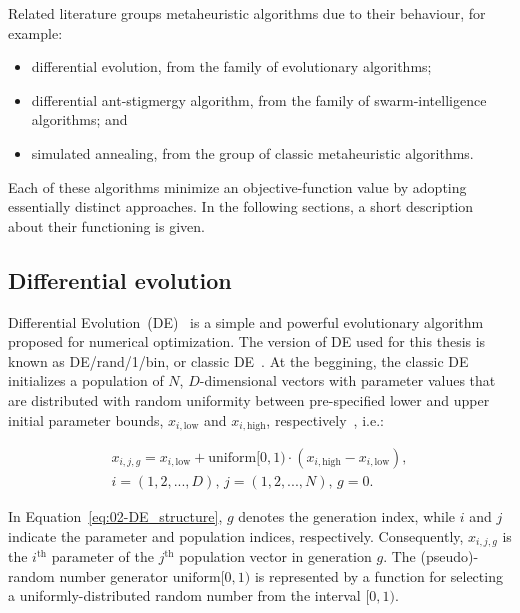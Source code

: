 \bigskip{}


Related literature groups metaheuristic algorithms due to their behaviour,
for example:
\begin{itemize}
\item differential evolution, from the family of evolutionary algorithms;
\item differential ant-stigmergy algorithm, from the family of swarm-intelligence
algorithms; and
\item simulated annealing, from the group of classic metaheuristic algorithms. 
\end{itemize}
Each of these algorithms minimize an objective-function value by adopting
essentially distinct approaches. In the following sections, a short
description about their functioning is given.


\subsection{Differential evolution \label{sub:02-DE}}

Differential Evolution~(DE)~\cite{storn1997_Differential_evolution}
is a simple and powerful evolutionary algorithm proposed for numerical
optimization. The version of DE used for this thesis is known as DE/rand/1/bin,
or \textquotedbl{}classic DE\textquotedbl{}~\cite{Price-Differential_evolution_a_practical_approach:2005}.
At the beggining, the classic DE initializes a population of $N$,
$D$-dimensional vectors with parameter values that are distributed
with random uniformity between pre-specified lower and upper initial
parameter bounds, $x_{i,\mathrm{{low}}}$ and $x_{i,\mathrm{{high}}}$,
respectively~\cite{Ronkkonen-Real_parameter_optimization_with_differential_evolution:2005},
i.e.:

\begin{multline}
x_{i,j,g}=x_{i,\mathrm{{low}}}+\mathrm{{uniform}[0,1)}\cdot(x_{i,\mathrm{{high}}}-x_{i,\mathrm{{low}}}),\\
i=(1,2,...,D),\, j=(1,2,...,N),\, g=0.\label{eq:02-DE_structure}
\end{multline}


\noindent In Equation~\ref{eq:02-DE_structure}, $g$ denotes the
generation index, while $i$ and $j$ indicate the parameter and population
indices, respectively. Consequently, $x_{i,j,g}$ is the $i^{\mathrm{th}}$
parameter of the $j^{\mathrm{th}}$ population vector in generation
$g$. The (pseudo)-random number generator $\mathrm{{uniform}[0,1)}$
is represented by a function for selecting a uniformly-distributed
random number from the interval $[0,1)$.

